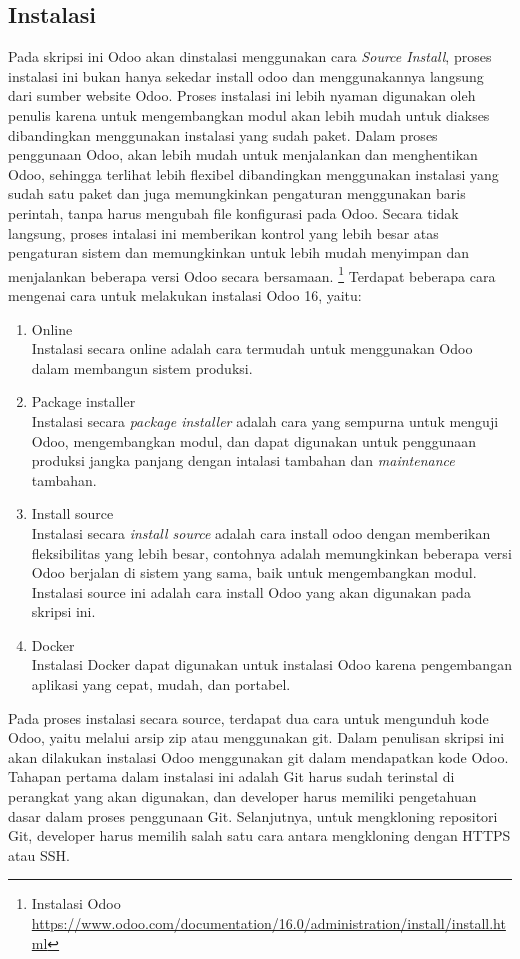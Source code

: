 \subsection{Instalasi}
\label{sec:instalasi}
Pada skripsi ini Odoo akan dinstalasi menggunakan cara \textit{Source Install}, proses instalasi ini bukan hanya sekedar install odoo dan menggunakannya langsung dari sumber website Odoo. Proses instalasi ini lebih nyaman digunakan oleh penulis karena untuk mengembangkan modul akan lebih mudah untuk diakses dibandingkan menggunakan instalasi yang sudah paket.
Dalam proses penggunaan Odoo, akan lebih mudah untuk menjalankan dan menghentikan Odoo, sehingga terlihat lebih flexibel dibandingkan menggunakan instalasi yang sudah satu paket dan juga memungkinkan pengaturan menggunakan baris perintah, tanpa harus mengubah file konfigurasi pada Odoo. Secara tidak langsung, proses intalasi ini memberikan kontrol yang lebih besar atas pengaturan sistem dan memungkinkan untuk lebih mudah menyimpan dan menjalankan beberapa versi Odoo secara bersamaan. \footnote{Instalasi Odoo \url{https://www.odoo.com/documentation/16.0/administration/install/install.html}} Terdapat beberapa cara mengenai cara untuk melakukan instalasi Odoo 16, yaitu:
\begin{enumerate}
	\item Online \\
	Instalasi secara online adalah cara termudah untuk menggunakan Odoo dalam membangun sistem produksi.
	\item Package installer \\
	Instalasi secara \textit{package installer} adalah cara yang sempurna untuk menguji Odoo, mengembangkan modul, dan dapat digunakan untuk penggunaan produksi jangka panjang dengan intalasi tambahan dan \textit{maintenance} tambahan.
	\item Install source \\
	Instalasi secara \textit{install source} adalah cara install odoo dengan memberikan fleksibilitas yang lebih besar, contohnya adalah memungkinkan beberapa versi Odoo berjalan di sistem yang sama, baik untuk mengembangkan modul. Instalasi source ini adalah cara install Odoo yang akan digunakan pada skripsi ini.
	\item Docker \\
	Instalasi Docker dapat digunakan untuk instalasi Odoo karena pengembangan aplikasi yang cepat, mudah, dan portabel.
\end{enumerate}

Pada proses instalasi secara source, terdapat dua cara untuk mengunduh kode Odoo, yaitu melalui arsip zip atau menggunakan git. Dalam penulisan skripsi ini akan dilakukan instalasi Odoo menggunakan git dalam mendapatkan kode Odoo. Tahapan pertama dalam instalasi ini adalah Git harus sudah terinstal di perangkat yang akan digunakan, dan developer harus memiliki pengetahuan dasar dalam proses penggunaan Git. Selanjutnya, untuk mengkloning repositori Git, developer harus memilih salah satu cara antara mengkloning dengan HTTPS atau SSH.

